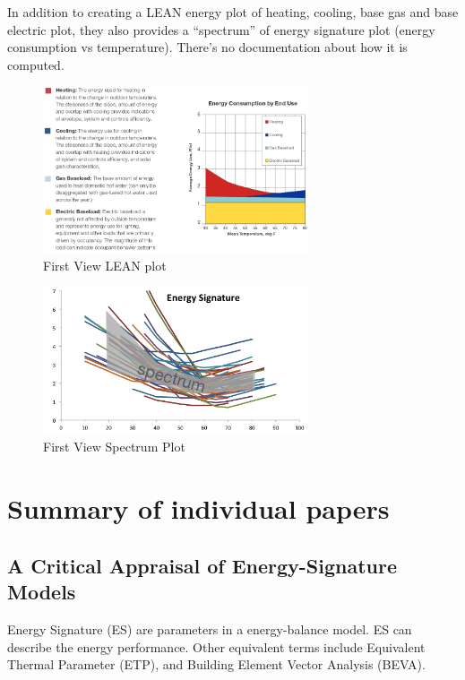 \documentclass[12pt]{article}
\begin{document}
\begin{itemize}
  In addition to creating a LEAN energy plot of heating, cooling, base
  gas and base electric plot, they also provides a ``spectrum'' of
  energy signature plot (energy consumption vs temperature). There's
  no documentation about how it is computed.
  \begin{figure}[h!]
    \centering
    \includegraphics[width=0.7\textwidth]{images/nbiLean.png}
    \caption{First View LEAN plot~\cite{firstViewUnder2016}}
    \label{fig:nbiLean}
  \end{figure}
  \FloatBarrier
  \begin{figure}[h!]
    \centering
    \includegraphics[width=0.7\textwidth]{images/nbiSpec.png}
    \caption{First View Spectrum Plot}
    \label{fig:nbiSpec}
  \end{figure}
  \FloatBarrier
\end{itemize}
\section{Summary of individual papers}
\subsection{A Critical Appraisal of Energy-Signature Models~\cite{hammarsten1987critical}}
Energy Signature (ES) are parameters in a energy-balance model. ES can
describe the energy performance. Other equivalent terms include
Equivalent Thermal Parameter (ETP), and Building Element Vector
Analysis (BEVA).
\end{document}
